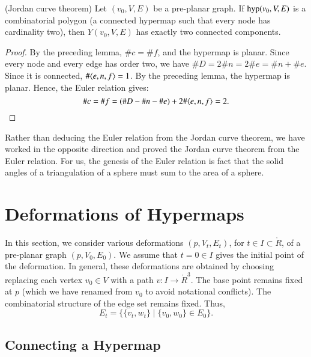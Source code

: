 \begin{lemma} (Jordan curve theorem)  Let $(v_0,V,E)$ be a pre-planar
graph.   If ${\operatorname{hyp}}(v_0,V,E)$ is a combinatorial polygon (a
connected hypermap such that every node has cardinality two), then
$Y(v_0,V,E)$ has exactly two connected components.
\end{lemma}

\begin{proof} By the preceding lemma, $\# c = \#f$, and the
hypermap is planar.  Since every node and every edge has order two,
we have $\#D = 2\#n = 2\# e = \#n +\#e$.  Since it is connected,
$\#\langle e,n,f\rangle = 1$.  By the preceding lemma, the hypermap is
planar. Hence, the Euler relation gives:
    $$
    \#c = \#f = (\#D - \#n - \#e) + 2\#\langle e,n,f\rangle =2.
    $$
\end{proof}

\begin{remark}   Rather than deducing the Euler relation from the Jordan
curve theorem, we have worked in the opposite direction and proved
the Jordan curve theorem from the Euler relation.  For us, the
genesis of the Euler relation is fact that the solid angles of a
triangulation of a sphere must sum to the area of a sphere.
\end{remark}





\section{Deformations of Hypermaps}

In this section, we consider various deformations $(p,V_t,E_t)$,
for $t\in I\subset \ring{R}$, of
a pre-planar graph $(p,V_0,E_0)$.  
We assume that $t=0\in I$ gives the initial point
of the deformation.  
In general, these deformations
are obtained by choosing replacing each vertex $v_0\in V$
with a path $v:I\to \ring{R}^3$.  
The base point remains fixed at $p$ 
(which we have renamed from $v_0$ to
avoid notational conflicts).
The combinatorial structure of the edge set remains
fixed.  
Thus,  
   $$
   E_t = \{ \{v_t,w_t\} \mid \{v_0,w_0\}\in E_0\}.
   $$


\subsection{Connecting a Hypermap}


